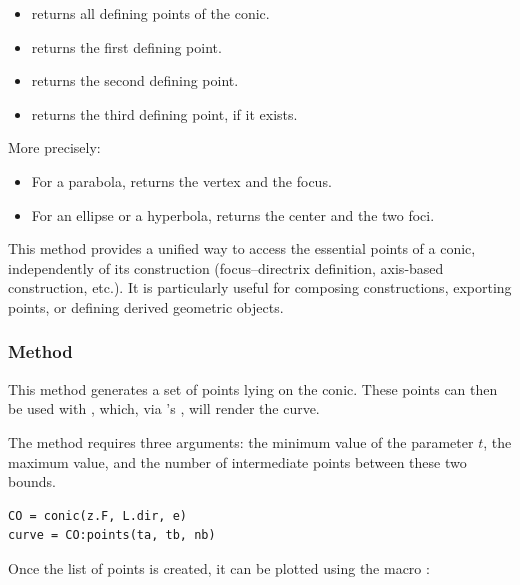   \medskip

  \begin{itemize}
    \item {} returns all defining points of the conic.
    \item {} returns the first defining point.
    \item {} returns the second defining point.
    \item {} returns the third defining point, if it exists.
  \end{itemize}

  \medskip

  More precisely:
  \begin{itemize}
    \item For a parabola,  returns the vertex and the focus.
    \item For an ellipse or a hyperbola,  returns the center and the two foci.
  \end{itemize}

  This method provides a unified way to access the essential points of a conic, independently of its construction (focus--directrix definition, axis-based construction, etc.). It is particularly useful for composing constructions, exporting points, or defining derived geometric objects.


\subsubsection{Method }
\label{ssub:method_conic_points}

This method generates a set of points lying on the conic. These points can then be used with , which, via \TIKZ{}'s , will render the curve.

The method requires three arguments: the minimum value of the parameter $t$, the maximum value, and the number of intermediate points between these two bounds.

\begin{mybox}
  \begin{verbatim}
CO = conic(z.F, L.dir, e)
curve = CO:points(ta, tb, nb)
  \end{verbatim}
\end{mybox}

Once the list of points is created, it can be plotted using the macro :

